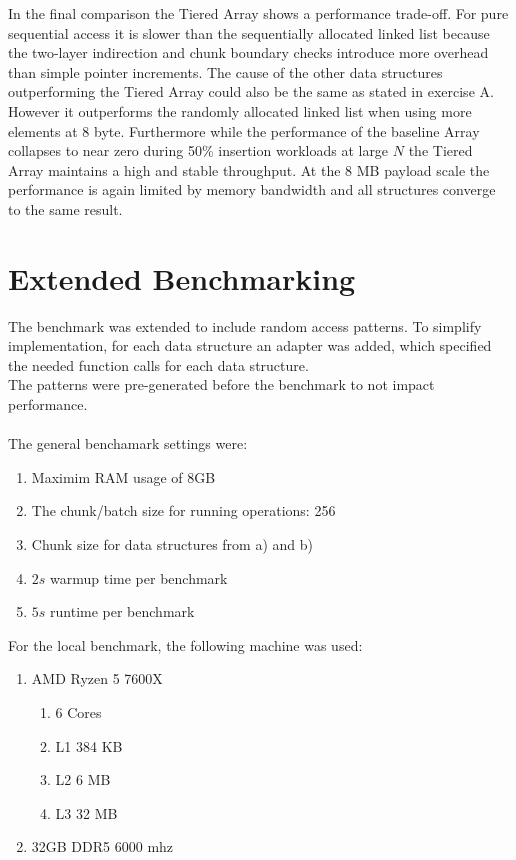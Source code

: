 \documentclass[a4paper]{article}
\begin{document}
In the final comparison the Tiered Array shows a performance trade-off. For pure sequential access it is slower than the sequentially allocated linked list because the two-layer indirection and chunk boundary checks introduce more overhead than simple pointer increments. The cause of the other data structures outperforming the Tiered Array could also be the same as stated in exercise A. However it outperforms the randomly allocated linked list when using more elements at 8 byte. Furthermore while the performance of the baseline Array collapses to near zero during 50\% insertion workloads at large $N$ the Tiered Array maintains a high and stable throughput. At the 8 MB payload scale the performance is again limited by memory bandwidth and all structures converge to the same result.

\newpage
\section{Extended Benchmarking}
The benchmark was extended to include random access patterns.
To simplify implementation, for each data structure an adapter was added, which specified the needed function calls for each data structure. 
\\
The patterns were pre-generated before the benchmark to not impact performance.
\\\\
The general benchamark settings were:
\begin{enumerate}
    \item Maximim RAM usage of $8$GB
    \item The chunk/batch size for running operations: 256
    \item Chunk size for data structures from a) and b)
    \item $2s$ warmup time per benchmark
    \item $5s$ runtime per benchmark
\end{enumerate}

\noindent
For the local benchmark, the following machine was used:
\begin{enumerate}
    \item AMD Ryzen 5 7600X
    \begin{enumerate}
        \item 6 Cores
        \item L1 384 KB
        \item L2 6 MB
        \item L3 32 MB
    \end{enumerate}
    \item 32GB DDR5 6000 mhz
\end{enumerate}
\end{document}

